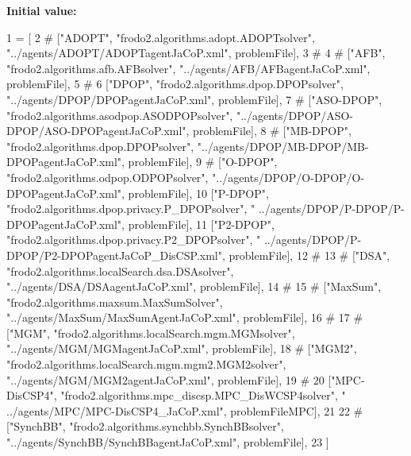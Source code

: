 {\bfseries Initial value\+:}
\begin{DoxyCode}
1 =  [
2 \textcolor{comment}{#        ["ADOPT", "frodo2.algorithms.adopt.ADOPTsolver", "../agents/ADOPT/ADOPTagentJaCoP.xml",
       problemFile], }
3 \textcolor{comment}{# }
4 \textcolor{comment}{#        ["AFB", "frodo2.algorithms.afb.AFBsolver", "../agents/AFB/AFBagentJaCoP.xml", problemFile], }
5 \textcolor{comment}{# }
6         [\textcolor{stringliteral}{"DPOP"}, \textcolor{stringliteral}{"frodo2.algorithms.dpop.DPOPsolver"}, \textcolor{stringliteral}{"../agents/DPOP/DPOPagentJaCoP.xml"}, problemFile], 
7 \textcolor{comment}{#        ["ASO-DPOP", "frodo2.algorithms.asodpop.ASODPOPsolver",
       "../agents/DPOP/ASO-DPOP/ASO-DPOPagentJaCoP.xml", problemFile], }
8 \textcolor{comment}{#        ["MB-DPOP", "frodo2.algorithms.dpop.DPOPsolver", "../agents/DPOP/MB-DPOP/MB-DPOPagentJaCoP.xml",
       problemFile], }
9 \textcolor{comment}{#         ["O-DPOP", "frodo2.algorithms.odpop.ODPOPsolver", "../agents/DPOP/O-DPOP/O-DPOPagentJaCoP.xml",
       problemFile], }
10         [\textcolor{stringliteral}{"P-DPOP"}, \textcolor{stringliteral}{"frodo2.algorithms.dpop.privacy.P\_DPOPsolver"}, \textcolor{stringliteral}{"
      ../agents/DPOP/P-DPOP/P-DPOPagentJaCoP.xml"}, problemFile], 
11         [\textcolor{stringliteral}{"P2-DPOP"}, \textcolor{stringliteral}{"frodo2.algorithms.dpop.privacy.P2\_DPOPsolver"}, \textcolor{stringliteral}{"
      ../agents/DPOP/P-DPOP/P2-DPOPagentJaCoP\_DisCSP.xml"}, problemFile], 
12 \textcolor{comment}{# }
13 \textcolor{comment}{#        ["DSA", "frodo2.algorithms.localSearch.dsa.DSAsolver", "../agents/DSA/DSAagentJaCoP.xml",
       problemFile], }
14 \textcolor{comment}{# }
15 \textcolor{comment}{#        ["MaxSum", "frodo2.algorithms.maxsum.MaxSumSolver", "../agents/MaxSum/MaxSumAgentJaCoP.xml",
       problemFile], }
16 \textcolor{comment}{# }
17 \textcolor{comment}{#        ["MGM", "frodo2.algorithms.localSearch.mgm.MGMsolver", "../agents/MGM/MGMagentJaCoP.xml",
       problemFile], }
18 \textcolor{comment}{#        ["MGM2", "frodo2.algorithms.localSearch.mgm.mgm2.MGM2solver", "../agents/MGM/MGM2agentJaCoP.xml",
       problemFile], }
19 \textcolor{comment}{# }
20         [\textcolor{stringliteral}{"MPC-DisCSP4"}, \textcolor{stringliteral}{"frodo2.algorithms.mpc\_discsp.MPC\_DisWCSP4solver"}, \textcolor{stringliteral}{"
      ../agents/MPC/MPC-DisCSP4\_JaCoP.xml"}, problemFileMPC], 
21 
22 \textcolor{comment}{#        ["SynchBB", "frodo2.algorithms.synchbb.SynchBBsolver", "../agents/SynchBB/SynchBBagentJaCoP.xml",
       problemFile], }
23         ]
\end{DoxyCode}
\mbox{\label{namespaceparty__experiment_a2de34e8bcf1c61d5963bc1677058931e}} 

